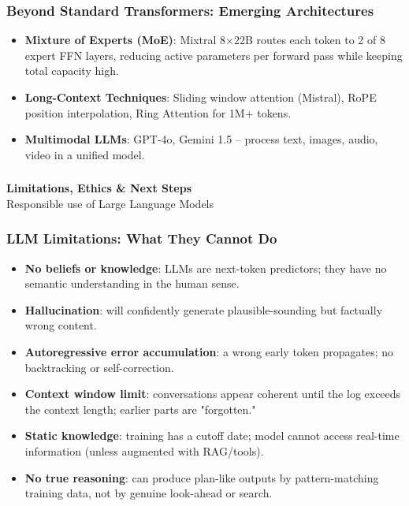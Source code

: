 \begin{frame}[fragile]\frametitle{Beyond Standard Transformers: Emerging Architectures}
\begin{itemize}
\item \textbf{Mixture of Experts (MoE)}: Mixtral 8×22B routes each token to 2 of 8 expert FFN layers, reducing active parameters per forward pass while keeping total capacity high.
\item \textbf{Long-Context Techniques}: Sliding window attention (Mistral), RoPE position interpolation, Ring Attention for 1M+ tokens.
\item \textbf{Multimodal LLMs}: GPT-4o, Gemini 1.5 – process text, images, audio, video in a unified model.
\end{itemize}
\end{frame}



\begin{frame}[fragile]\frametitle{}
\begin{center}
{\Large \textbf{Limitations, Ethics \& Next Steps}}\\[0.5em]
{\normalsize Responsible use of Large Language Models}
\end{center}
\end{frame}

\begin{frame}[fragile]\frametitle{LLM Limitations: What They Cannot Do}
\begin{itemize}
\item \textbf{No beliefs or knowledge}: LLMs are next-token predictors; they have no semantic understanding in the human sense.
\item \textbf{Hallucination}: will confidently generate plausible-sounding but factually wrong content.
\item \textbf{Autoregressive error accumulation}: a wrong early token propagates; no backtracking or self-correction.
\item \textbf{Context window limit}: conversations appear coherent until the log exceeds the context length; earlier parts are "forgotten."
\item \textbf{Static knowledge}: training has a cutoff date; model cannot access real-time information (unless augmented with RAG/tools).
\item \textbf{No true reasoning}: can produce plan-like outputs by pattern-matching training data, not by genuine look-ahead or search.
\end{itemize}
\end{frame}

